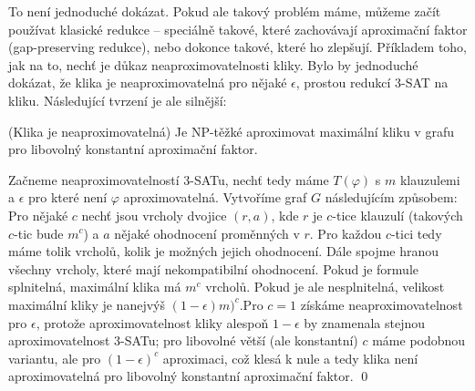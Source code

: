 To není jednoduché dokázat. Pokud ale takový problém máme, můžeme začít používat
klasické redukce -- speciálně takové, které zachovávají aproximační faktor
(gap-preserving redukce), nebo dokonce takové, které ho zlepšují. Příkladem
toho, jak na to, nechť je důkaz neaproximovatelnosti kliky. Bylo by jednoduché
dokázat, že klika je neaproximovatelná pro nějaké $\epsilon$, prostou redukcí
$3$-SAT na kliku. Následující tvrzení je ale silnější:

\vt (Klika je neaproximovatelná) Je NP-těžké aproximovat maximální kliku v grafu
pro libovolný konstantní aproximační faktor.

\dk Začneme neaproximovatelností $3$-SATu, nechť tedy máme $T(\varphi)$ s $m$
klauzulemi a
$\epsilon$ pro které není $\varphi$ aproximovatelná. Vytvoříme graf $G$
následujícím způsobem: Pro nějaké $c$ nechť jsou vrcholy dvojice $(r,a)$, kde
$r$ je $c$-tice klauzulí (takových $c$-tic bude $m^c$) a $a$ nějaké ohodnocení
proměnných v $r$. Pro každou $c$-tici tedy máme tolik vrcholů, kolik je možných
jejich ohodnocení. Dále spojme hranou všechny vrcholy, které mají nekompatibilní
ohodnocení. Pokud je formule splnitelná, maximální klika má $m^c$ vrcholů. Pokud
je ale nesplnitelná, velikost maximální kliky je nanejvýš $(1-\epsilon)m)^c$.Pro
$c=1$ získáme neaproximovatelnost pro $\epsilon$, protože aproximovatelnost
kliky alespoň $1-\epsilon$ by znamenala stejnou aproximovatelnost $3$-SATu;
pro libovolné větší (ale konstantní) $c$ máme podobnou variantu, ale pro
$(1-\epsilon)^c$ aproximaci, což klesá k nule a tedy klika není aproximovatelná
pro libovolný konstantní aproximační faktor. \qed

